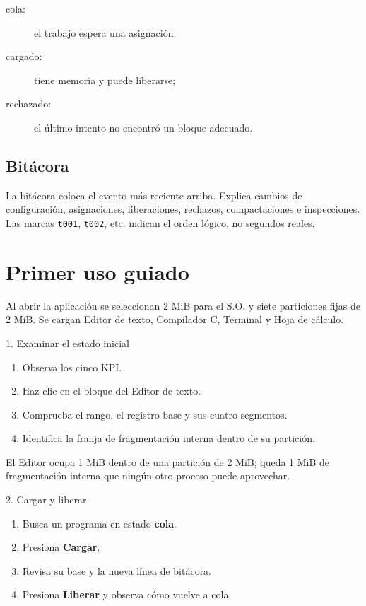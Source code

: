 \documentclass[11pt,a4paper]{article}
\newcommand{\control}[1]{\textsf{\textbf{#1}}}
\begin{document}
\begin{description}
  \item[cola:] el trabajo espera una asignación;
  \item[cargado:] tiene memoria y puede liberarse;
  \item[rechazado:] el último intento no encontró un bloque adecuado.
\end{description}

\subsection{Bitácora}

La bitácora coloca el evento más reciente arriba. Explica cambios de configuración,
asignaciones, liberaciones, rechazos, compactaciones e inspecciones. Las marcas
\texttt{t001}, \texttt{t002}, etc. indican el orden lógico, no segundos reales.

\section{Primer uso guiado}

Al abrir la aplicación se seleccionan 2 MiB para el S.O. y siete particiones fijas
de 2 MiB. Se cargan Editor de texto, Compilador C, Terminal y Hoja de cálculo.

\begin{paso}{1. Examinar el estado inicial}
\begin{enumerate}
  \item Observa los cinco KPI.
  \item Haz clic en el bloque del Editor de texto.
  \item Comprueba el rango, el registro base y sus cuatro segmentos.
  \item Identifica la franja de fragmentación interna dentro de su partición.
\end{enumerate}
\end{paso}

\begin{resultado}
El Editor ocupa 1 MiB dentro de una partición de 2 MiB; queda 1 MiB de
fragmentación interna que ningún otro proceso puede aprovechar.
\end{resultado}

\begin{paso}{2. Cargar y liberar}
\begin{enumerate}
  \item Busca un programa en estado \control{cola}.
  \item Presiona \control{Cargar}.
  \item Revisa su base y la nueva línea de bitácora.
  \item Presiona \control{Liberar} y observa cómo vuelve a cola.
\end{enumerate}
\end{paso}
\end{document}
